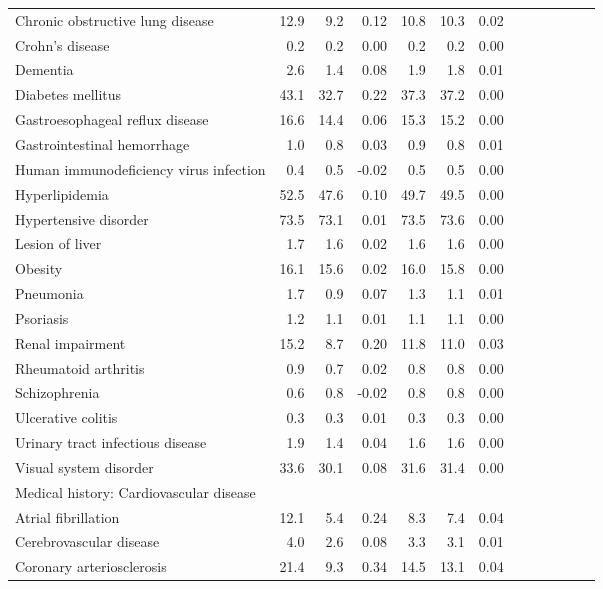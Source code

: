 \documentclass[11pt,]{article}
\begin{document}
\begin{longtable}{lrrrrrrrrrrrr}
      Chronic obstructive lung disease & 12.9 &  9.2 &  0.12 & 10.8 & 10.3 &  0.02 \\ 
      Crohn's disease &  0.2 &  0.2 &  0.00 &  0.2 &  0.2 &  0.00 \\ 
      Dementia &  2.6 &  1.4 &  0.08 &  1.9 &  1.8 &  0.01 \\ 
      Diabetes mellitus & 43.1 & 32.7 &  0.22 & 37.3 & 37.2 &  0.00 \\ 
      Gastroesophageal reflux disease & 16.6 & 14.4 &  0.06 & 15.3 & 15.2 &  0.00 \\ 
      Gastrointestinal hemorrhage &  1.0 &  0.8 &  0.03 &  0.9 &  0.8 &  0.01 \\ 
      Human immunodeficiency virus infection &  0.4 &  0.5 & -0.02 &  0.5 &  0.5 &  0.00 \\ 
      Hyperlipidemia & 52.5 & 47.6 &  0.10 & 49.7 & 49.5 &  0.00 \\ 
      Hypertensive disorder & 73.5 & 73.1 &  0.01 & 73.5 & 73.6 &  0.00 \\ 
      Lesion of liver &  1.7 &  1.6 &  0.02 &  1.6 &  1.6 &  0.00 \\ 
      Obesity & 16.1 & 15.6 &  0.02 & 16.0 & 15.8 &  0.00 \\ 
      Pneumonia &  1.7 &  0.9 &  0.07 &  1.3 &  1.1 &  0.01 \\ 
      Psoriasis &  1.2 &  1.1 &  0.01 &  1.1 &  1.1 &  0.00 \\ 
      Renal impairment & 15.2 &  8.7 &  0.20 & 11.8 & 11.0 &  0.03 \\ 
      Rheumatoid arthritis &  0.9 &  0.7 &  0.02 &  0.8 &  0.8 &  0.00 \\ 
      Schizophrenia &  0.6 &  0.8 & -0.02 &  0.8 &  0.8 &  0.00 \\ 
      Ulcerative colitis &  0.3 &  0.3 &  0.01 &  0.3 &  0.3 &  0.00 \\ 
      Urinary tract infectious disease &  1.9 &  1.4 &  0.04 &  1.6 &  1.6 &  0.00 \\ 
      Visual system disorder & 33.6 & 30.1 &  0.08 & 31.6 & 31.4 &  0.00 \\ 
  Medical history: Cardiovascular disease &    &    &     &    &    &     \\ 
      Atrial fibrillation & 12.1 &  5.4 &  0.24 &  8.3 &  7.4 &  0.04 \\ 
      Cerebrovascular disease &  4.0 &  2.6 &  0.08 &  3.3 &  3.1 &  0.01 \\ 
      Coronary arteriosclerosis & 21.4 &  9.3 &  0.34 & 14.5 & 13.1 &  0.04 \\ 

\end{longtable}
\end{document}
